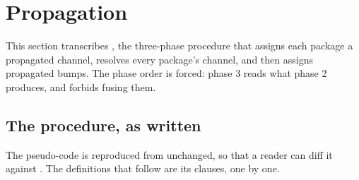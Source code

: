 \section{Propagation}
\label{sec:propagation}

This section transcribes , the three-phase procedure that assigns
each package a propagated channel, resolves every package's channel, and then
assigns propagated bumps. The phase order is forced: phase 3 reads what phase 2
produces, and  forbids fusing them.

\subsection{The procedure, as written}

The pseudo-code is reproduced from  unchanged, so that a reader can
diff it against . The definitions that follow are its
clauses, one by one.


